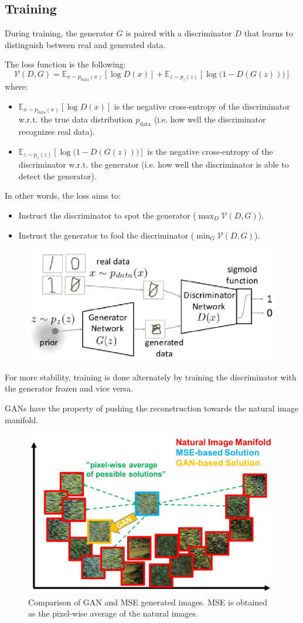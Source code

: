 \subsection{Training}
During training, the generator $G$ is paired with a discriminator $D$ that learns to distinguish between real and generated data.

The loss function is the following:
\[
    \mathcal{V}(D, G) = \mathbb{E}_{x \sim p_\text{data}(x)}[\log D(x)] + \mathbb{E}_{z \sim p_z(z)}[\log\big( 1 - D(G(z)) \big)]
\]
where:
\begin{itemize}
    \item $\mathbb{E}_{x \sim p_\text{data}(x)}[\log D(x)]$ is the negative cross-entropy of the discriminator w.r.t. the true data distribution $p_\text{data}$
        (i.e. how well the discriminator recognizes real data).
    \item $\mathbb{E}_{z \sim p_z(z)}[\log\big( 1 - D(G(z)) \big)]$ is the negative cross-entropy of the discriminator w.r.t. the generator
        (i.e. how well the discriminator is able to detect the generator).
\end{itemize}
In other words, the loss aims to:
\begin{itemize}
    \item Instruct the discriminator to spot the generator ($\max_D \mathcal{V}(D, G)$).
    \item Instruct the generator to fool the discriminator ($\min_G \mathcal{V}(D, G)$).
\end{itemize}

\begin{figure}[H]
    \centering
    \includegraphics[width=0.5\linewidth]{./img/gan.png}
\end{figure}

For more stability, training is done alternately by training the discriminator with the generator frozen and vice versa.

\begin{remark}
    GANs have the property of pushing the reconstruction towards the natural image manifold.
    \begin{figure}[H]
        \centering
        \includegraphics[width=0.4\linewidth]{./img/gan_manifold.png}
        \caption{Comparison of GAN and MSE generated images. MSE is obtained as the pixel-wise average of the natural images.}
    \end{figure}
\end{remark}


